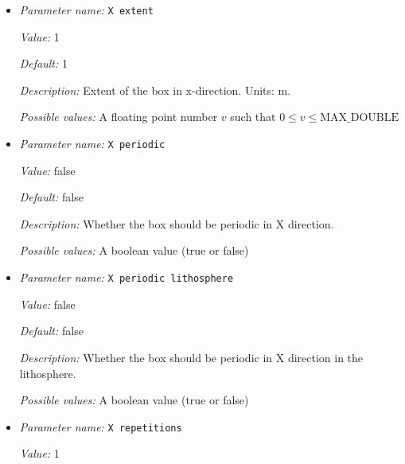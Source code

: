 \begin{itemize}
{\it Default:} 0.2


{\it Description:} The thickness of the lithosphere used to create additional boundary indicators to set specific boundary conditions for the lithosphere. 


{\it Possible values:} A floating point number $v$ such that $0 \leq v \leq \text{MAX\_DOUBLE}$
\item {\it Parameter name:} {\tt X extent}
\label{parameters:Geometry model/Box with lithosphere boundary indicators/X extent}


{\it Value:} 1


{\it Default:} 1


{\it Description:} Extent of the box in x-direction. Units: m.


{\it Possible values:} A floating point number $v$ such that $0 \leq v \leq \text{MAX\_DOUBLE}$
\item {\it Parameter name:} {\tt X periodic}
\label{parameters:Geometry model/Box with lithosphere boundary indicators/X periodic}


{\it Value:} false


{\it Default:} false


{\it Description:} Whether the box should be periodic in X direction.


{\it Possible values:} A boolean value (true or false)
\item {\it Parameter name:} {\tt X periodic lithosphere}
\label{parameters:Geometry model/Box with lithosphere boundary indicators/X periodic lithosphere}


{\it Value:} false


{\it Default:} false


{\it Description:} Whether the box should be periodic in X direction in the lithosphere.


{\it Possible values:} A boolean value (true or false)
\item {\it Parameter name:} {\tt X repetitions}
\label{parameters:Geometry model/Box with lithosphere boundary indicators/X repetitions}


{\it Value:} 1



\end{itemize}
